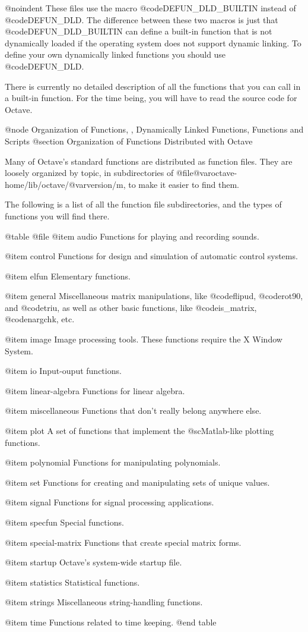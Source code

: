 @noindent
These files use the macro @code{DEFUN_DLD_BUILTIN} instead of
@code{DEFUN_DLD}.  The difference between these two macros is just that
@code{DEFUN_DLD_BUILTIN} can define a built-in function that is not
dynamically loaded if the operating system does not support dynamic
linking.  To define your own dynamically linked functions you should use
@code{DEFUN_DLD}.

There is currently no detailed description of all the functions that you
can call in a built-in function.  For the time being, you will have to
read the source code for Octave.

@node Organization of Functions,  , Dynamically Linked Functions, Functions and Scripts
@section Organization of Functions Distributed with Octave

Many of Octave's standard functions are distributed as function files.
They are loosely organized by topic, in subdirectories of
@file{@var{octave-home}/lib/octave/@var{version}/m}, to make it easier
to find them.

The following is a list of all the function file subdirectories, and the
types of functions you will find there.

@table @file
@item audio
Functions for playing and recording sounds.

@item control
Functions for design and simulation of automatic control systems.

@item elfun
Elementary functions.

@item general
Miscellaneous matrix manipulations, like @code{flipud}, @code{rot90},
and @code{triu}, as well as other basic functions, like
@code{is_matrix}, @code{nargchk}, etc.

@item image
Image processing tools.  These functions require the X Window System.

@item io
Input-ouput functions.

@item linear-algebra
Functions for linear algebra.

@item miscellaneous
Functions that don't really belong anywhere else.

@item plot
A set of functions that implement the @sc{Matlab}-like plotting functions.

@item polynomial
Functions for manipulating polynomials.

@item set
Functions for creating and manipulating sets of unique values.

@item signal
Functions for signal processing applications.

@item specfun
Special functions.

@item special-matrix
Functions that create special matrix forms.

@item startup
Octave's system-wide startup file.

@item statistics
Statistical functions.

@item strings
Miscellaneous string-handling functions.

@item time
Functions related to time keeping.
@end table
